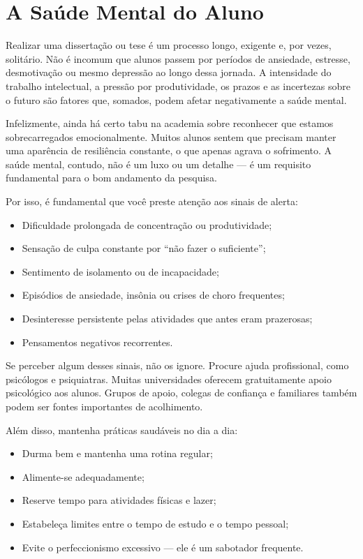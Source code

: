 \section{A Saúde Mental do Aluno}

Realizar uma dissertação ou tese é um processo longo, exigente e, por vezes, solitário. Não é incomum que alunos passem por períodos de ansiedade, estresse, desmotivação ou mesmo depressão ao longo dessa jornada. A intensidade do trabalho intelectual, a pressão por produtividade, os prazos e as incertezas sobre o futuro são fatores que, somados, podem afetar negativamente a saúde mental.

Infelizmente, ainda há certo tabu na academia sobre reconhecer que estamos sobrecarregados emocionalmente. Muitos alunos sentem que precisam manter uma aparência de resiliência constante, o que apenas agrava o sofrimento. A saúde mental, contudo, não é um luxo ou um detalhe — é um requisito fundamental para o bom andamento da pesquisa.


Por isso, é fundamental que você preste atenção aos sinais de alerta:
\begin{itemize}
    \item Dificuldade prolongada de concentração ou produtividade;
    \item Sensação de culpa constante por “não fazer o suficiente”;
    \item Sentimento de isolamento ou de incapacidade;
    \item Episódios de ansiedade, insônia ou crises de choro frequentes;
    \item Desinteresse persistente pelas atividades que antes eram prazerosas;
    \item Pensamentos negativos recorrentes.
\end{itemize}

Se perceber algum desses sinais, não os ignore. Procure ajuda profissional, como psicólogos e psiquiatras. Muitas universidades oferecem gratuitamente apoio psicológico aos alunos. Grupos de apoio, colegas de confiança e familiares também podem ser fontes importantes de acolhimento.

Além disso, mantenha práticas saudáveis no dia a dia:
\begin{itemize}
    \item Durma bem e mantenha uma rotina regular;
    \item Alimente-se adequadamente;
    \item Reserve tempo para atividades físicas e lazer;
    \item Estabeleça limites entre o tempo de estudo e o tempo pessoal;
    \item Evite o perfeccionismo excessivo — ele é um sabotador frequente.
\end{itemize}


